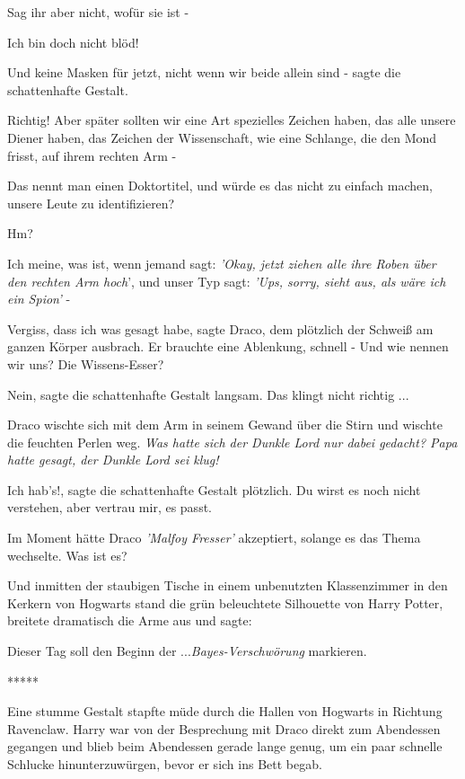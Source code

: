 \glqq{}Sag ihr aber nicht, wofür sie ist -\grqq{}

\glqq{}Ich bin doch nicht blöd!\grqq{}

\glqq{}Und keine Masken für jetzt, nicht wenn wir beide allein sind -\grqq{}
sagte die schattenhafte Gestalt.

\glqq{}Richtig! Aber später sollten wir eine Art spezielles Zeichen haben, das
alle unsere Diener haben, das Zeichen der Wissenschaft, wie eine Schlange, die
den Mond frisst, auf ihrem rechten Arm -\grqq{}

\glqq{}Das nennt man einen Doktortitel, und würde es das nicht zu einfach machen,
unsere Leute zu identifizieren?\grqq{}

\glqq{}Hm?\grqq{}

\glqq{}Ich meine, was ist, wenn jemand sagt: \emph{'Okay, jetzt ziehen alle ihre
Roben über den rechten Arm hoch}', und unser Typ sagt: \emph{'Ups, sorry, sieht
aus, als wäre ich ein Spion'} -\grqq{}

\glqq{}Vergiss, dass ich was gesagt habe\grqq{}, sagte Draco, dem plötzlich der
Schweiß am ganzen Körper ausbrach. Er brauchte eine Ablenkung, schnell - \glqq{}
Und wie nennen wir uns? Die Wissens-Esser?\grqq{}

\glqq{}Nein\grqq{}, sagte die schattenhafte Gestalt langsam. \glqq{}Das klingt
nicht richtig ...\grqq{}

Draco wischte sich mit dem Arm in seinem Gewand über die Stirn und wischte die
feuchten Perlen weg. \emph{Was hatte sich der Dunkle Lord nur dabei gedacht?
Papa hatte gesagt, der Dunkle Lord sei klug!}

\glqq{}Ich hab's!\grqq{}, sagte die schattenhafte Gestalt plötzlich. \glqq{}Du
wirst es noch nicht verstehen, aber vertrau mir, es passt.\grqq{}

Im Moment hätte Draco \emph{'Malfoy Fresser'} akzeptiert, solange es das Thema
wechselte. \glqq{}Was ist es?\grqq{}

Und inmitten der staubigen Tische in einem unbenutzten Klassenzimmer in den
Kerkern von Hogwarts stand die grün beleuchtete Silhouette von Harry Potter,
breitete dramatisch die Arme aus und sagte:

\glqq{}Dieser Tag soll den Beginn der ...\emph{Bayes-Verschwörung}
markieren.\grqq{}

\begin{center}*****\end{center}

Eine stumme Gestalt stapfte müde durch die Hallen von Hogwarts in Richtung
Ravenclaw. Harry war von der Besprechung mit Draco direkt zum Abendessen
gegangen und blieb beim Abendessen gerade lange genug, um ein paar schnelle
Schlucke hinunterzuwürgen, bevor er sich ins Bett begab.


